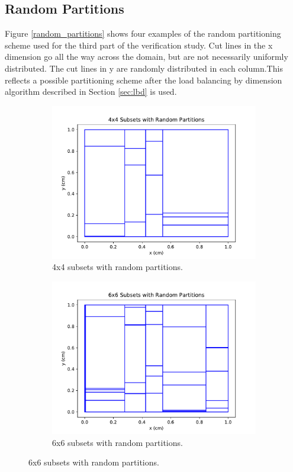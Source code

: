\subsection{Random Partitions}
Figure \ref{random_partitions} shows four examples of the random partitioning scheme used for the third part of the verification study. Cut lines in the x dimension go all the way across the domain, but are not necessarily uniformly distributed. The cut lines in y are randomly distributed in each column.This reflects a possible partitioning scheme after the load balancing by dimension algorithm described in Section \ref{sec:lbd} is used.
\begin{figure}[H]
\centering
\begin{subfigure}[b]{0.45\textwidth}
  \includegraphics[width=\textwidth]{../cut_line_files/4_random.pdf}
  \caption{4x4 subsets with random partitions.}
  \label{4random}
\end{subfigure}
\begin{subfigure}[b]{0.45\textwidth}
  \includegraphics[width=\textwidth]{../cut_line_files/6_random.pdf}
  \caption{6x6 subsets with random partitions.}
  \label{6random}
\end{subfigure}


\end{figure}
